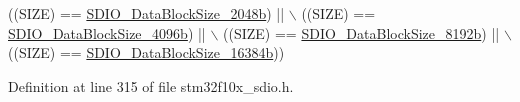 \begin{DoxyCode}
                                  ((SIZE) == \hyperlink{group___s_d_i_o___data___block___size_ga41eb937621c7ffcf2688c6bc0ea31464}{SDIO\_DataBlockSize\_2048b}) || \(\backslash\)
                                  ((SIZE) == \hyperlink{group___s_d_i_o___data___block___size_ga360411488abdbaf9eee9b99fca793f79}{SDIO\_DataBlockSize\_4096b}) || \(\backslash\)
                                  ((SIZE) == \hyperlink{group___s_d_i_o___data___block___size_gaf61913f3eff52c0f728db9ffbdaca7d2}{SDIO\_DataBlockSize\_8192b}) || \(\backslash\)
                                  ((SIZE) == \hyperlink{group___s_d_i_o___data___block___size_gae80bc49dbed677f7087d523c31fe10ae}{SDIO\_DataBlockSize\_16384b}))
\end{DoxyCode}


Definition at line 315 of file stm32f10x\+\_\+sdio.\+h.

